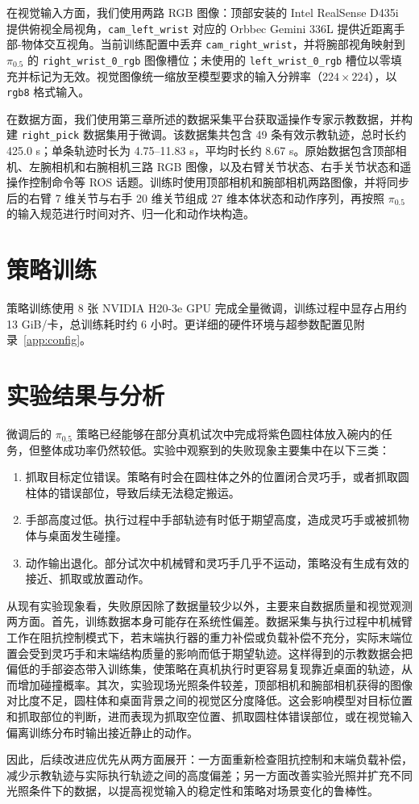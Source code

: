 在视觉输入方面，我们使用两路 RGB 图像：顶部安装的 Intel RealSense D435i 提供俯视全局视角，\texttt{cam\_left\_wrist} 对应的 Orbbec Gemini 336L 提供近距离手部-物体交互视角。当前训练配置中丢弃 \texttt{cam\_right\_wrist}，并将腕部视角映射到 $\pi_{0.5}$ 的 \texttt{right\_wrist\_0\_rgb} 图像槽位；未使用的 \texttt{left\_wrist\_0\_rgb} 槽位以零填充并标记为无效。视觉图像统一缩放至模型要求的输入分辨率（$224 \times 224$），以 \texttt{rgb8} 格式输入。

在数据方面，我们使用第三章所述的数据采集平台获取遥操作专家示教数据，并构建 \texttt{right\_pick} 数据集用于微调。该数据集共包含 49 条有效示教轨迹，总时长约 425.0 s；单条轨迹时长为 4.75--11.83 s，平均时长约 8.67 s。原始数据包含顶部相机、左腕相机和右腕相机三路 RGB 图像，以及右臂关节状态、右手关节状态和遥操作控制命令等 ROS 话题。训练时使用顶部相机和腕部相机两路图像，并将同步后的右臂 7 维关节与右手 20 维关节组成 27 维本体状态和动作序列，再按照 $\pi_{0.5}$ 的输入规范进行时间对齐、归一化和动作块构造。

\section{策略训练}

策略训练使用 8 张 NVIDIA H20\mbox{-}3e GPU 完成全量微调，训练过程中显存占用约 13 GiB/卡，总训练耗时约 6 小时。更详细的硬件环境与超参数配置见附录~\ref{app:config}。

\section{实验结果与分析}

微调后的 $\pi_{0.5}$ 策略已经能够在部分真机试次中完成将紫色圆柱体放入碗内的任务，但整体成功率仍然较低。实验中观察到的失败现象主要集中在以下三类：
\begin{enumerate}
    \item 抓取目标定位错误。策略有时会在圆柱体之外的位置闭合灵巧手，或者抓取圆柱体的错误部位，导致后续无法稳定搬运。
    \item 手部高度过低。执行过程中手部轨迹有时低于期望高度，造成灵巧手或被抓物体与桌面发生碰撞。
    \item 动作输出退化。部分试次中机械臂和灵巧手几乎不运动，策略没有生成有效的接近、抓取或放置动作。
\end{enumerate}

从现有实验现象看，失败原因除了数据量较少以外，主要来自数据质量和视觉观测两方面。首先，训练数据本身可能存在系统性偏差。数据采集与执行过程中机械臂工作在阻抗控制模式下，若末端执行器的重力补偿或负载补偿不充分，实际末端位置会受到灵巧手和末端结构质量的影响而低于期望轨迹。这样得到的示教数据会把偏低的手部姿态带入训练集，使策略在真机执行时更容易复现靠近桌面的轨迹，从而增加碰撞概率。其次，实验现场光照条件较差，顶部相机和腕部相机获得的图像对比度不足，圆柱体和桌面背景之间的视觉区分度降低。这会影响模型对目标位置和抓取部位的判断，进而表现为抓取空位置、抓取圆柱体错误部位，或在视觉输入偏离训练分布时输出接近静止的动作。

因此，后续改进应优先从两方面展开：一方面重新检查阻抗控制和末端负载补偿，减少示教轨迹与实际执行轨迹之间的高度偏差；另一方面改善实验光照并扩充不同光照条件下的数据，以提高视觉输入的稳定性和策略对场景变化的鲁棒性。
